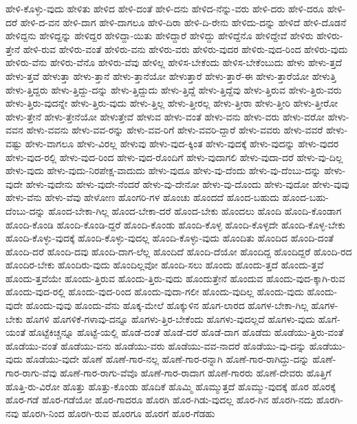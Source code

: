 {ಹೇಳಿ-ಕೊಳ್ಳು-ವುದು
ಹೇಳಿತು
ಹೇಳಿದ
ಹೇಳಿ-ದಂತೆ
ಹೇಳಿ-ದನು
ಹೇಳಿದ-ನೆನ್ನು-ವರು
ಹೇಳಿ-ದರು
ಹೇಳಿ-ದರೂ
ಹೇಳಿ-ದರೆ
ಹೇಳಿ-ದ-ವನ
ಹೇಳಿ-ದಾಗ
ಹೇಳಿ-ದಾಗಲೂ
ಹೇಳಿ-ದಿರಾ
ಹೇಳಿ-ದಿ-ರೇನು
ಹೇಳಿದು-ದನ್ನು
ಹೇಳಿದೆ
ಹೇಳಿ-ದೊಡನೆ
ಹೇಳಿದ್ದನು
ಹೇಳಿದ್ದನ್ನು
ಹೇಳಿದ್ದರ
ಹೇಳಿದ್ದಾ-ಯಿತು
ಹೇಳಿದ್ದಾರೆ
ಹೇಳಿದ್ದು
ಹೇಳಿದ್ದೆನೊ
ಹೇಳಿದ್ದೇವೆ
ಹೇಳಿರು
ಹೇಳಿರು-ತ್ತೇನೆ
ಹೇಳಿ-ರುವ
ಹೇಳಿರು-ವಂತೆ
ಹೇಳಿರು-ವನು
ಹೇಳಿರು-ವರು
ಹೇಳಿರು-ವುದರ
ಹೇಳಿರು-ವುದ-ರಿಂದ
ಹೇಳಿರು-ವುದು
ಹೇಳಿರು-ವೆನು
ಹೇಳಿರು-ವೆನೊ
ಹೇಳಿರು-ವೆವು
ಹೇಳಿಲ್ಲ
ಹೇಳಿಸ-ಬೇಕೆಂದು
ಹೇಳಿಸ-ಬೇಕೆಂಬುದು
ಹೇಳು
ಹೇಳು-ತ್ತದೆ
ಹೇಳು-ತ್ತವೆ
ಹೇಳುತ್ತಾ
ಹೇಳು-ತ್ತಾನೆ
ಹೇಳು-ತ್ತಾನೆಯೋ
ಹೇಳುತ್ತಾರೆ
ಹೇಳು-ತ್ತಾರೆ-ಈ
ಹೇಳು-ತ್ತಾರೆಯೋ
ಹೇಳುತ್ತಿ
ಹೇಳು-ತ್ತಿದ್ದರು
ಹೇಳು-ತ್ತಿದ್ದು-ದನ್ನು
ಹೇಳು-ತ್ತಿದ್ದುದು
ಹೇಳು-ತ್ತಿದ್ದೆ
ಹೇಳು-ತ್ತಿದ್ದೆವು
ಹೇಳು-ತ್ತಿರುವ
ಹೇಳು-ತ್ತಿರು-ವರು
ಹೇಳು-ತ್ತಿರು-ವುದನ್ನೇ
ಹೇಳು-ತ್ತಿರು-ವುದು
ಹೇಳು-ತ್ತಿಲ್ಲ
ಹೇಳು-ತ್ತೀರಲ್ಲ
ಹೇಳು-ತ್ತೀರಾ
ಹೇಳು-ತ್ತೀರಿ
ಹೇಳು-ತ್ತೀರೋ
ಹೇಳು-ತ್ತೇನೆ
ಹೇಳು-ತ್ತೇನೆಯೋ
ಹೇಳುತ್ತೇವೆ
ಹೇಳುವ
ಹೇಳು-ವಂತೆ
ಹೇಳು-ವನು
ಹೇಳು-ವರು
ಹೇಳು-ವರೋ
ಹೇಳು-ವವನ
ಹೇಳು-ವವನು
ಹೇಳು-ವವ-ರನ್ನು
ಹೇಳು-ವವ-ರಿಗೆ
ಹೇಳು-ವವರಿ-ದ್ದಾರೆ
ಹೇಳು-ವವರು
ಹೇಳು-ವವರೆ
ಹೇಳು-ವಷ್ಟು
ಹೇಳು-ವಾಗಲೂ
ಹೇಳು-ವಿರಲ್ಲ
ಹೇಳುವು
ಹೇಳು-ವುದ-ಕ್ಕಿಂತ
ಹೇಳು-ವುದಕ್ಕೆ
ಹೇಳು-ವುದನ್ನು
ಹೇಳು-ವುದರ
ಹೇಳು-ವುದ-ರಲ್ಲಿ
ಹೇಳು-ವುದ-ರಿಂದ
ಹೇಳು-ವುದ-ರೊಂದಿಗೆ
ಹೇಳು-ವುದಾಗಲಿ
ಹೇಳು-ವುದಾ-ದರೆ
ಹೇಳು-ವು-ದಿಲ್ಲ
ಹೇಳು-ವುದು
ಹೇಳು-ವುದು-ನಿರಪೇಕ್ಷ-ವಾದುದು
ಹೇಳು-ವುದೂ
ಹೇಳು-ವು-ದೆಂದು
ಹೇಳು-ವು-ದೆಂಬು-ದನ್ನು
ಹೇಳು-ವುದೇ
ಹೇಳು-ವುದೇನು
ಹೇಳು-ವುದೇ-ನೆಂದರೆ
ಹೇಳು-ವು-ದೇನೋ
ಹೇಳು-ವು-ದೊಂದು
ಹೇಳು-ವುದೋ
ಹೇಳು-ವುವು
ಹೇಳು-ವೆನು
ಹೇಳು-ವೆವು
ಹೇಳೋಣ
ಹೊಂಗರಿ-ಗಳ
ಹೊಂಚು
ಹೊಂದದೆ
ಹೊಂದ-ಬಹುದು
ಹೊಂದ-ಬಹು-ದೆಂಬು-ದನ್ನು
ಹೊಂದ-ಬೇಕಾ-ಗಿಲ್ಲ
ಹೊಂದ-ಬೇಕಾ-ದರೆ
ಹೊಂದ-ಬೇಕು
ಹೊಂದಲು
ಹೊಂದಿ
ಹೊಂದಿ-ಕೊಂಡಾಗ
ಹೊಂದಿ-ಕೊಂಡಿ
ಹೊಂದಿ-ಕೊಂಡಿ-ದ್ದರೆ
ಹೊಂದಿ-ಕೊಂಡು
ಹೊಂದಿ-ಕೊಳ್ಳ
ಹೊಂದಿ-ಕೊಳ್ಳದೇ
ಹೊಂದಿ-ಕೊಳ್ಳ-ಬೇಕು
ಹೊಂದಿ-ಕೊಳ್ಳು-ವುದಕ್ಕೆ
ಹೊಂದಿ-ಕೊಳ್ಳು-ವುದಲ್ಲ
ಹೊಂದಿ-ಕೊಳ್ಳು-ವುದು
ಹೊಂದಿತು
ಹೊಂದಿದ
ಹೊಂದಿ-ದಂತೆ
ಹೊಂದಿ-ದರೆ
ಹೊಂದಿ-ದವು
ಹೊಂದಿ-ದಾಗ-ಲೆಲ್ಲ
ಹೊಂದಿದೆ
ಹೊಂದಿ-ದೆಯೋ
ಹೊಂದಿದ್ದ
ಹೊಂದಿದ್ದರೆ
ಹೊಂದಿ-ರದ
ಹೊಂದಿರ-ಬೇಕು
ಹೊಂದಿರು-ವುದು
ಹೊಂದಿಲ್ಲವೋ
ಹೊಂದಿ-ಸಲು
ಹೊಂದು
ಹೊಂದು-ತ್ತದೆ
ಹೊಂದು-ತ್ತವೆ
ಹೊಂದು-ತ್ತವೆಯೇ
ಹೊಂದು-ತ್ತಿರುವ
ಹೊಂದು-ತ್ತಿರು-ವುದು
ಹೊಂದುತ್ತೇನೆ
ಹೊಂದುವ
ಹೊಂದು-ವುದ-ಕ್ಕಾಗಿ-ರುವ
ಹೊಂದು-ವುದ-ರಲ್ಲಿ
ಹೊಂದು-ವುದ-ರಿಂದ
ಹೊಂದು-ವುದಾ-ಗಲೀ
ಹೊಂದು-ವುದಿಲ್ಲ
ಹೊಂದು-ವುದು
ಹೊಂದು-ವುದೇ
ಹೊಂದು-ವುವು
ಹೊಂದು-ವೆನು
ಹೊಕ್ಕ-ಮೇಲೆ
ಹೊಕ್ಕುಳಿನ
ಹೊಗ-ಲಾರದ
ಹೊಗಳ-ಬೇಕಾ-ಗಿಲ್ಲ
ಹೊಗಳ-ಬೇಕು
ಹೊಗಳಿ
ಹೊಗಳಿಕೆ-ಗಳಾವು-ದನ್ನೂ
ಹೊಗಳು-ತ್ತಿರ-ಬೇಕೆಂದು
ಹೊಗಳು-ವುದಲ್ಲದೆ
ಹೊಗಳು-ವುದು
ಹೊಗೆ-ಯಂತೆ
ಹೊಟ್ಟೆಕಿಚ್ಚನ್ನೂ
ಹೊಟ್ಟೆ-ಯಲ್ಲಿ
ಹೊಡೆ-ದಂತೆ
ಹೊಡೆ-ದರೆ
ಹೊಡೆ-ದಾಗ
ಹೊಡೆದು
ಹೊಡೆಯು-ತ್ತಿರು-ವಂತೆ
ಹೊಡೆಯು-ವಂತೆ
ಹೊಡೆಯು-ವನು
ಹೊಡೆಯು-ವರು
ಹೊಡೆಯು-ವವ-ನಾದರೆ
ಹೊಡೆಯು-ವು-ದನ್ನು
ಹೊಡೆಯು-ವುದು
ಹೊಡೆಯು-ವುದೇ
ಹೊಣೆ
ಹೊಣೆ-ಗಾರ-ನಲ್ಲ
ಹೊಣೆ-ಗಾರ-ರನ್ನಾಗಿ
ಹೊಣೆ-ಗಾರ-ರಾಗಿದ್ದು-ದನ್ನು
ಹೊಣೆ-ಗಾರ-ರಾಗು-ವೆವು
ಹೊಣೆ-ಗಾರ-ರಾಗು-ವೆವೊ
ಹೊಣೆ-ಗಾರ-ರಾದಾಗ
ಹೊಣೆ-ಗಾರರು
ಹೊಣೆ-ದೇವರು
ಹೊತ್ತಿಗೆ
ಹೊತ್ತಿ-ರು-ವಿರೋ
ಹೊತ್ತು
ಹೊತ್ತು-ಕೊಂಡು
ಹೊದಿಕೆ
ಹೊಮ್ಮಿ
ಹೊಮ್ಮುತ್ತದೆ
ಹೊಮ್ಮು-ವುದಕ್ಕೆ
ಹೊರ
ಹೊರಕ್ಕೆ
ಹೊರ-ಗಡೆ
ಹೊರ-ಗಡೆಯೋ
ಹೊರ-ಗಾದರೂ
ಹೊರಗಿ
ಹೊರ-ಗಿಡು-ವುದಲ್ಲ
ಹೊರ-ಗಿನ
ಹೊರಗಿ-ನದು
ಹೊರಗಿ-ನವು
ಹೊರಗಿ-ನಿಂದ
ಹೊರಗಿ-ರುವ
ಹೊರಗೂ
ಹೊರಗೆ
ಹೊರ-ಗೆಡಹು
}

